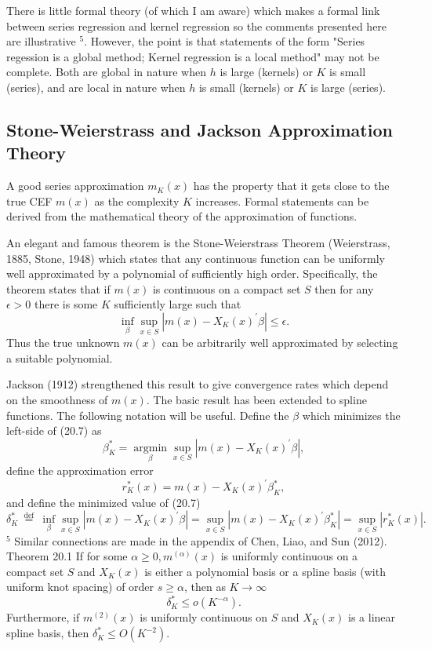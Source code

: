 \documentclass[10pt]{article}
\begin{document}
There is little formal theory (of which I am aware) which makes a formal link between series regression and kernel regression so the comments presented here are illustrative ${ }^{5}$. However, the point is that statements of the form "Series regession is a global method; Kernel regression is a local method" may not be complete. Both are global in nature when $h$ is large (kernels) or $K$ is small (series), and are local in nature when $h$ is small (kernels) or $K$ is large (series).

\subsection{Stone-Weierstrass and Jackson Approximation Theory}
A good series approximation $m_{K}(x)$ has the property that it gets close to the true CEF $m(x)$ as the complexity $K$ increases. Formal statements can be derived from the mathematical theory of the approximation of functions.

An elegant and famous theorem is the Stone-Weierstrass Theorem (Weierstrass, 1885, Stone, 1948) which states that any continuous function can be uniformly well approximated by a polynomial of sufficiently high order. Specifically, the theorem states that if $m(x)$ is continuous on a compact set $S$ then for any $\epsilon>0$ there is some $K$ sufficiently large such that
$$
\inf _{\beta} \sup _{x \in S}\left|m(x)-X_{K}(x)^{\prime} \beta\right| \leq \epsilon .
$$
Thus the true unknown $m(x)$ can be arbitrarily well approximated by selecting a suitable polynomial.

Jackson (1912) strengthened this result to give convergence rates which depend on the smoothness of $m(x)$. The basic result has been extended to spline functions. The following notation will be useful. Define the $\beta$ which minimizes the left-side of (20.7) as
$$
\beta_{K}^{*}=\underset{\beta}{\operatorname{argmin}} \sup _{x \in S}\left|m(x)-X_{K}(x)^{\prime} \beta\right|,
$$
define the approximation error
$$
r_{K}^{*}(x)=m(x)-X_{K}(x)^{\prime} \beta_{K}^{*},
$$
and define the minimized value of (20.7)
$$
\delta_{K}^{*} \stackrel{\text { def }}{=} \inf _{\beta} \sup _{x \in S}\left|m(x)-X_{K}(x)^{\prime} \beta\right|=\sup _{x \in S}\left|m(x)-X_{K}(x)^{\prime} \beta_{K}^{*}\right|=\sup _{x \in S}\left|r_{K}^{*}(x)\right| .
$$
${ }^{5}$ Similar connections are made in the appendix of Chen, Liao, and Sun (2012). Theorem 20.1 If for some $\alpha \geq 0, m^{(\alpha)}(x)$ is uniformly continuous on a compact set $S$ and $X_{K}(x)$ is either a polynomial basis or a spline basis (with uniform knot spacing) of order $s \geq \alpha$, then as $K \rightarrow \infty$
$$
\delta_{K}^{*} \leq o\left(K^{-\alpha}\right) .
$$
Furthermore, if $m^{(2)}(x)$ is uniformly continuous on $S$ and $X_{K}(x)$ is a linear spline basis, then $\delta_{K}^{*} \leq O\left(K^{-2}\right)$.
\end{document}
